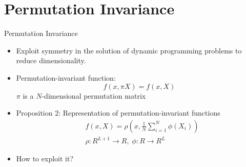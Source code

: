 \documentclass[dvipsnames,mathserif]{beamer}
\begin{document}
{\section{Permutation Invariance}
\begin{frame}{Permutation Invariance}
    \begin{itemize}
        \item Exploit symmetry in the solution of dynamic programming problems to reduce dimensionality.\\
        \vspace{0.2cm}
        \item Permutation-invariant function:
        \[f(x,\pi X) = f(x,X)\]
        $\pi$ is a $N$-dimensional permutation matrix
        \item Proposition 2: Representation of permutation-invariant functions
        \begin{align*}
        &f(x,X) = \rho(x,\frac{1}{N}\sum_{i=1}^{N}\phi(X_i))\\
        &\rho: R^{L+1} \rightarrow R ,\; \phi: R \rightarrow R^{L}
        \end{align*}
        \item How to exploit it?
    \end{itemize}
\end{frame}


}
\end{document}

